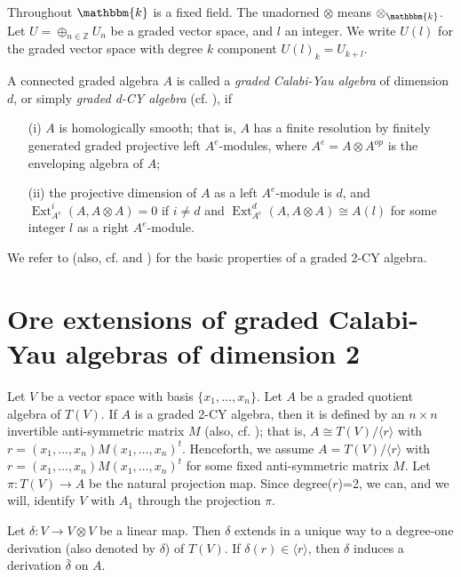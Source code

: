 \documentclass[a4paper]{amsart}
\begin{document}
Throughout ${\mathbbm{k}}$ is a fixed field. The unadorned ${\otimes}$ means ${\otimes}_{\mathbbm{k}}$. Let $U={\oplus}_{n\in \mathbb{Z}}U_n$ be a graded vector space, and $l$ an integer. We write $U(l)$ for the graded vector space with degree $k$ component $U(l)_k=U_{k+l}$.

A connected graded algebra $A$ is called a {\it graded Calabi-Yau algebra} of dimension $d$, or simply {\it graded d-CY algebra} (cf. \cite{Gin}), if

\begin{itemize}
\item[(i)] $A$ is
homologically smooth; that is, $A$ has a finite resolution by
finitely generated graded projective left $A^e$-modules, where $A^e=A{\otimes} A^{op}$ is the enveloping algebra of $A$;

\item[(ii)] the projective dimension of $A$ as a left $A^e$-module is $d$, and ${\operatorname {Ext}}^i_{A^e}(A,A{\otimes} A)=0$ if $i\neq d$ and ${\operatorname {Ext}}_{A^e}^d(A,A{\otimes} A)\cong A(l)$ for some integer $l$ as a right $A^e$-module.
\end{itemize}

We refer to \cite{Z} (also, cf. \cite{Ber} and \cite{DV}) for the basic properties of a graded 2-CY algebra.

\section{Ore extensions of graded Calabi-Yau algebras of dimension 2}

Let $V$ be a vector space with basis $\{x_1,\dots,x_n\}$. Let $A$ be a graded quotient algebra of $T(V)$. If $A$ is a graded 2-CY algebra, then it is defined by an $n\times n$ invertible anti-symmetric matrix $M$ \cite{Z} (also, cf. \cite[Proposition 3.4]{Ber}); that is, $A\cong T(V)/\langle r\rangle$ with $r=(x_1,\dots,x_n)M(x_1,\dots,x_n)^t$. Henceforth, we assume $A=T(V)/\langle r\rangle$ with \\ $r=(x_1,\dots,x_n)M(x_1,\dots,x_n)^t$ for some fixed anti-symmetric matrix $M$. Let $\pi:T(V)\to A$ be the natural projection map. Since degree($r$)=2, we can, and we will, identify $V$ with $A_1$ through the projection $\pi$.

Let $\delta:V\to V{\otimes} V$ be a linear map. Then $\delta$ extends in  a unique way to a degree-one derivation (also denoted by $\delta$) of $T(V)$. If $\delta(r)\in \langle r\rangle$, then $\delta$ induces a derivation $\bar{\delta}$ on $A$.
\end{document}
